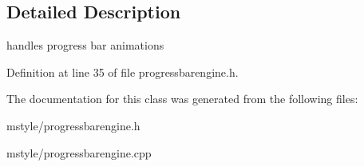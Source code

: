 \subsection{Detailed Description}
handles progress bar animations 

Definition at line 35 of file progressbarengine.\+h.



The documentation for this class was generated from the following files\+:\begin{DoxyCompactItemize}
\item 
mstyle/progressbarengine.\+h\item 
mstyle/progressbarengine.\+cpp\end{DoxyCompactItemize}
